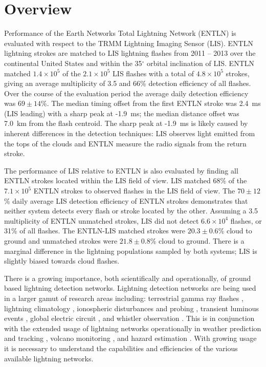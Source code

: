 \section{Overview}

Performance of the Earth Networks Total Lightning Network (ENTLN) is evaluated with respect to the TRMM Lightning Imaging Sensor (LIS).
ENTLN lightning strokes are matched to LIS lightning flashes from 2011 -- 2013 over the continental United States and within the 35$^\circ$ orbital inclination of LIS.
ENTLN matched $1.4\times10^5$ of the $2.1\times10^5$ LIS flashes with a total of $4.8\times10^5$ strokes, giving an average multiplicity of 3.5 and 66\% detection efficiency of all flashes.
Over the course of the evaluation period the average daily detection efficiency was $69\pm14$\%.
The median timing offset from the first ENTLN stroke was 2.4~ms (LIS leading) with a sharp peak at -1.9~ms; the median distance offset was 7.0~km from the flash centroid.
The sharp peak at -1.9~ms is likely caused by inherent differences in the detection techniques: LIS observes light emitted from the tops of the clouds and ENTLN measure the radio signals from the return stroke.

The performance of LIS relative to ENTLN is also evaluated by finding all ENTLN strokes located within the LIS field of view.
LIS matched 68\% of the $7.1\times10^5$ ENTLN strokes to observed flashes in the LIS field of view.
The $70\pm12$\% daily average LIS detection efficiency of ENTLN strokes demonstrates that neither system detects every flash or stroke located by the other.
Assuming a 3.5 multiplicity of ENTLN unmatched strokes, LIS did not detect $6.6\times10^4$ flashes, or 31\% of all flashes.
The ENTLN-LIS matched strokes were $20.3\pm0.6$\% cloud to ground and unmatched strokes were $21.8\pm0.8$\% cloud to ground.
There is a marginal difference in the lightning populations sampled by both systems;  LIS is slightly biased towards cloud flashes.

There is a growing importance, both scientifically and operationally, of ground based lightning detection networks.
Lightning detection networks are being used in a larger gamut of research areas including: terrestrial gamma ray flashes \citep{Dwyer2012, Gjesteland2011, Connaughton2010}, lightning climatology \citep{Virts2013, Virts2011a, Burgesser2012}, ionospheric disturbances and probing \citep{Jacobson2010, Singh2011}, transient luminous events \citep{Soula2011}, global electric circuit  \citep{Holzworth2005}, and whistler observation \citep{Collier2010, Collier2011a, Burkholder2013}.
This is in conjunction with the extended usage of lightning networks operationally in weather prediction and tracking \citep{Fierro2012, Pan2010, Thomas2010d}, volcano monitoring \citep{Doughton2010}, and hazard estimation \citep{Altaratz2010}.
With growing usage it is necessary to understand the capabilities and efficiencies of the various available lightning networks.

